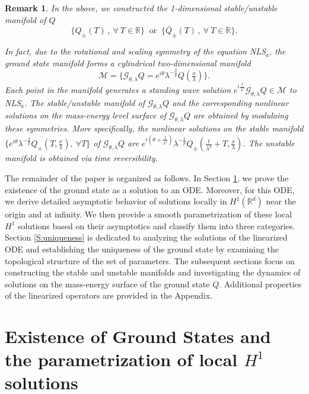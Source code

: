 \documentclass[12pt]{amsart}
\newcommand{\R}{\mathbb R}
\newtheorem{remark}[theorem]{Remark}
\begin{document}
   \begin{remark} \label{R:1.3}
   In the above, we constructed the 1-dimensional stable/unstable manifold of $Q$ 
    \[
    \{Q_{\pm}(T)\, , \ \forall\ T \in \mathbb{R}\} \ \text{ or } \ \{\bar Q_{\pm}(T)\, , \ \forall\ T \in \mathbb{R}\}.
    \] 
   
   In fact, due to the rotational and scaling symmetry of the equation NLS$_a$, the ground state manifold forms a cylindrical two-dimensional manifold 
     \[
    \mathcal{M} = \{ \mathcal G_{\theta, \lambda} Q=e^{i\theta}\lambda^{-\frac 2p}Q(\tfrac x\lambda)\}.
     \]  
   Each point in the manifold generates a standing wave solution $e^{i\frac t{\lambda^2}}\mathcal G_{\theta,\lambda}Q \in \mathcal{M}$ to NLS$_a$. 
   The stable/unstable manifold of $\mathcal G_{\theta,\lambda}Q$ and the corresponding nonlinear solutions on the mass-energy level surface of $\mathcal G_{\theta,\lambda}Q$ are obtained by moduloing these symmetries. More specifically, the nonlinear solutions on the stable manifold $\{e^{i\theta}\lambda^{-\frac 2p}Q_{\pm}(T, \frac x\lambda), \ \forall T\}$ of $\mathcal G_{\theta,\lambda}Q$ are $e^{i(\theta+\frac t{\lambda^2} )}\lambda^{-\frac 2p}Q_{\pm}(\frac t{\lambda^2}+T,\frac x\lambda)$. The unstable manifold is obtained via time reversibility. 
\end{remark}
    
  
  The remainder of the paper is organized as follows. In Section \ref{S:groundS}, we prove the existence of the ground state as a solution to an ODE. Moreover, for this ODE, we derive detailed asymptotic behavior of solutions locally in $H^1(\R^d)$ near the origin and at infinity. We then provide a smooth parametrization of these local $H^1$ solutions based on their asymptotics and classify them into three categories. Section \ref{S:uniqueness} is dedicated to analyzing the solutions of the linearized ODE and establishing the uniqueness of the ground state by examining the topological structure of the set of parameters. The subsequent sections focus on constructing the stable and unstable manifolds and investigating the dynamics of solutions on the mass-energy surface of the ground state $Q$. Additional properties of the linearized operators are provided in the Appendix.

\section{Existence of Ground States and the parametrization of local $H^1$ solutions} \label{S:groundS}
\end{document}
